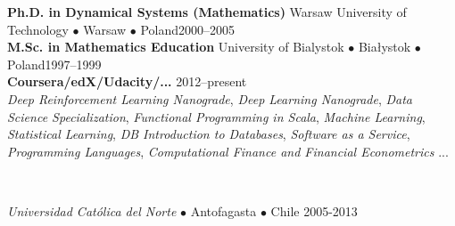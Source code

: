 \documentclass[a4paper, oneside]{scrreprt}
\begin{document}
\noindent\textbf{Ph.D. in Dynamical Systems (Mathematics)} Warsaw University of Technology $\bullet$ Warsaw $\bullet$ Poland\hfill 2000--2005\\
\noindent\textbf{M.Sc. in Mathematics Education} University of Bialystok $\bullet$ Białystok $\bullet$ Poland\hfill 1997--1999\\
\noindent\textbf{Coursera/edX/Udacity/...} \hfill 2012--present\\
\emph{Deep Reinforcement Learning Nanograde}, 
\emph{Deep Learning Nanograde}, \emph{Data Science Specialization}, \emph{Functional Programming in Scala}, 
\emph{Machine Learning},  \emph{Statistical Learning}, 
\emph{DB Introduction to Databases}, \emph{Software as a Service}, 
\emph{Programming Languages}, 
\emph{Computational Finance and Financial Econometrics} ... \\
\noindent\makebox[\linewidth]{\rule{\textwidth}{0.4pt}}


\newpage

\ \\

\vspace{4cm}

\noindent\makebox[\linewidth]{\rule{\textwidth}{0.4pt}}





\noindent{}\textit{Universidad Católica del Norte} $\bullet$ 
Antofagasta $\bullet$ Chile \hfill 2005-2013\\
\\
\end{document}
